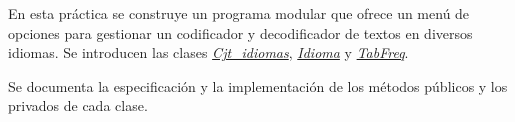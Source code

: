 En esta práctica se construye un programa modular que ofrece un menú de opciones para gestionar un codificador y decodificador de textos en diversos idiomas. Se introducen las clases {\itshape \hyperlink{class_cjt__idiomas}{Cjt\+\_\+idiomas}}, {\itshape \hyperlink{class_idioma}{Idioma}} y {\itshape \hyperlink{class_tab_freq}{Tab\+Freq}}.

Se documenta la especificación y la implementación de los métodos públicos y los privados de cada clase. 